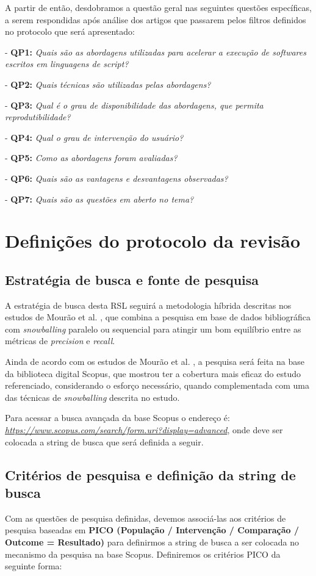\documentclass[sigconf]{acmart}
\begin{document}
A partir de então, desdobramos a questão geral nas seguintes questões específicas, a serem respondidas após análise dos artigos que passarem pelos filtros definidos no protocolo que será apresentado:  

- \textbf{QP1:} {\textit{Quais são as abordagens utilizadas para acelerar a execução de softwares escritos em linguagens de script?}}

- \textbf{QP2:} {\textit{Quais técnicas são utilizadas pelas abordagens?}}

- \textbf{QP3:} {\textit{Qual é o grau de disponibilidade das abordagens, que permita reprodutibilidade?}}

- \textbf{QP4:} {\textit{Qual o grau de intervenção do usuário?}}

- \textbf{QP5:} {\textit{Como as abordagens foram avaliadas?}}

- \textbf{QP6:} {\textit{Quais são as vantagens e desvantagens observadas?}}

- \textbf{QP7:} {\textit{Quais são as questões em aberto no tema?}}


\section{Definições do protocolo da revisão}
\subsection{Estratégia de busca e fonte de pesquisa}
A estratégia de busca desta RSL seguirá a metodologia híbrida descritas nos estudos de Mourão et al. \cite{mourao2020performance}, que combina a pesquisa em base de dados bibliográfica com \textit{snowballing} paralelo ou sequencial para atingir um bom equilíbrio entre as métricas de \textit{precision} e \textit{recall}.

Ainda de acordo com os estudos de Mourão et al. \cite{mourao2020performance}, a pesquisa será feita na base da biblioteca digital Scopus, que mostrou ter a cobertura mais eficaz do estudo referenciado, considerando o esforço necessário, quando complementada com uma das técnicas de \textit{snowballing} descrita no estudo.

Para acessar a busca avançada da base Scopus o endereço é: \textit{\url{https://www.scopus.com/search/form.uri?display=advanced}}, onde deve ser colocada a string de busca que será definida a seguir.


\subsection{Critérios de pesquisa e definição da string de busca}
Com as questões de pesquisa definidas, devemos associá-las aos critérios de pesquisa baseadas em \textbf{PICO (População / Intervenção / Comparação / Outcome = Resultado)} para definirmos a string de busca a ser colocada no mecanismo da pesquisa na base Scopus. Definiremos os critérios PICO da seguinte forma:
\end{document}
